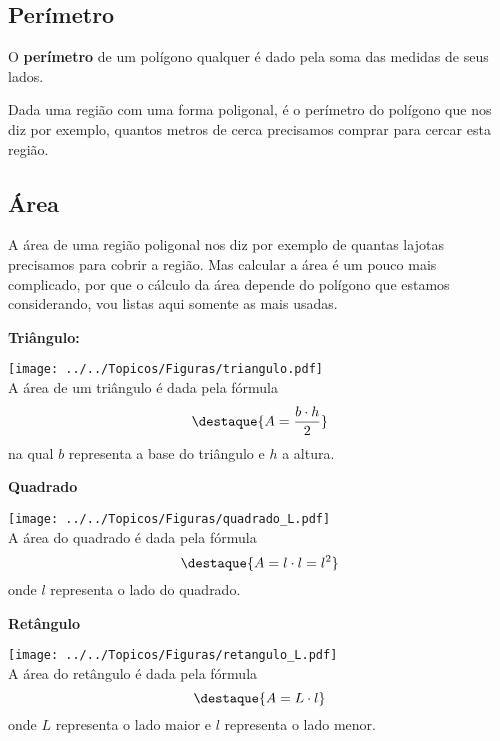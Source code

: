 \subsection{Perímetro}

\vskip0.3cm
 \colorbox{amarelo}{
 \begin{minipage}{14.5cm}
 \begin{center}
  O \textbf{perímetro} de um polígono qualquer é dado pela soma das medidas de seus lados.
 \end{center}
 \end{minipage}}
 \vskip0.3cm


Dada uma região com uma forma poligonal, é o perímetro do polígono que nos diz por exemplo, quantos metros de cerca precisamos comprar para cercar esta região.

\subsection{Área}

A área de uma região poligonal nos diz por exemplo de quantas lajotas precisamos para cobrir a região. Mas calcular a área é um pouco mais complicado, por que o cálculo da área depende do polígono que estamos considerando, vou listas aqui somente as mais usadas. 

\textbf{Triângulo:}
\begin{multicols}{2}

\texttt{[image: ../../Topicos/Figuras/triangulo.pdf]} \\
A área de um triângulo é dada pela fórmula 
\[\destaque{A= \frac{b \cdot h}{2}}\]
na qual $b$ representa a base do triângulo e $h$ a altura.
\end{multicols}

\textbf{Quadrado}
\begin{multicols}{2}
\texttt{[image: ../../Topicos/Figuras/quadrado\_L.pdf]} \\
A área do quadrado é dada pela fórmula
\[\destaque{A= l \cdot l= l^2}\]
onde $l$ representa o lado do quadrado.
\end{multicols}

\textbf{Retângulo}
\begin{multicols}{2}
\texttt{[image: ../../Topicos/Figuras/retangulo\_L.pdf]} \\
A área do retângulo é dada pela fórmula
\[\destaque{A= L \cdot l}\]
onde $L$ representa o lado maior e $l$ representa o lado menor.
\end{multicols}

